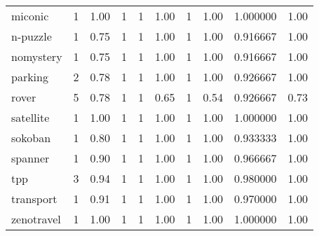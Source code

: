 \begin{table}
\begin{tabular}{lrrrrrrrrr}
     miconic &   1 &        1.00 &           1 &              1 &           1.00 &              1 &           1.00 &  1.000000 &  1.00 \\
    n-puzzle &   1 &        0.75 &           1 &              1 &           1.00 &              1 &           1.00 &  0.916667 &  1.00 \\
   nomystery &   1 &        0.75 &           1 &              1 &           1.00 &              1 &           1.00 &  0.916667 &  1.00 \\
     parking &   2 &        0.78 &           1 &              1 &           1.00 &              1 &           1.00 &  0.926667 &  1.00 \\
       rover &   5 &        0.78 &           1 &              1 &           0.65 &              1 &           0.54 &  0.926667 &  0.73 \\
   satellite &   1 &        1.00 &           1 &              1 &           1.00 &              1 &           1.00 &  1.000000 &  1.00 \\
     sokoban &   1 &        0.80 &           1 &              1 &           1.00 &              1 &           1.00 &  0.933333 &  1.00 \\
     spanner &   1 &        0.90 &           1 &              1 &           1.00 &              1 &           1.00 &  0.966667 &  1.00 \\
         tpp &   3 &        0.94 &           1 &              1 &           1.00 &              1 &           1.00 &  0.980000 &  1.00 \\
   transport &   1 &        0.91 &           1 &              1 &           1.00 &              1 &           1.00 &  0.970000 &  1.00 \\
  zenotravel &   1 &        1.00 &           1 &              1 &           1.00 &              1 &           1.00 &  1.000000 &  1.00 \\
\bottomrule
\end{tabular}
\end{table}
